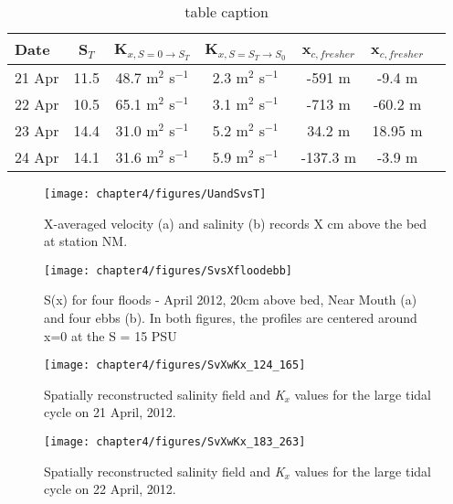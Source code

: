 \begin{table}
\renewcommand{\arraystretch}{1.3}

	\begin{center}
		\begin{tabular}{| l || c | c | c | c | c | c |}
		\hline
		Date & S$_{T}$ & K$_{x,S=0 \rightarrow S_T}$ &  K$_{x,S=S_T \rightarrow S_0}$ & x$_{c,fresher}$ & x$_{c,fresher}$\\
		\hline \hline
		21 Apr & 11.5 & 48.7 m$^2$ s$^{-1}$ & 2.3 m$^2$ s$^{-1}$ & -591 m & -9.4 m\\ 
		22 Apr & 10.5 & 65.1 m$^2$ s$^{-1}$ & 3.1 m$^2$ s$^{-1}$ & -713 m & -60.2 m\\ 
		23 Apr & 14.4 & 31.0 m$^2$ s$^{-1}$ & 5.2 m$^2$ s$^{-1}$ & 34.2 m & 18.95 m\\ 
		24 Apr & 14.1 & 31.6 m$^2$ s$^{-1}$ & 5.9 m$^2$ s$^{-1}$ & -137.3 m & -3.9 m\\  \hline 
	\end{tabular}
	\caption{table caption}\label{tab:Kxtable}
\end{center}
\end{table}






\begin{figure}
	\texttt{[image: chapter4/figures/UandSvsT]} 
\caption{X-averaged velocity (a) and salinity (b) records X cm above the bed at station NM.} \label{fig:UandSvsTch4}
\end{figure}

\begin{figure}
	\texttt{[image: chapter4/figures/SvsXfloodebb]} 
\caption{S(x) for four floods - April 2012, 20cm above bed, Near Mouth (a) and four ebbs (b). In both figures, the profiles are centered around x=0 at the S = 15 PSU} \label{fig:SvsXall}
\end{figure}

\begin{figure}
	\texttt{[image: chapter4/figures/SvXwKx\_124\_165]} 
\caption{Spatially reconstructed salinity field and \emph{K$_x$} values for the large tidal cycle on 21 April, 2012. } \label{fig:Kx421}
\end{figure}

\begin{figure}
	\texttt{[image: chapter4/figures/SvXwKx\_183\_263]} 
\caption{Spatially reconstructed salinity field and \emph{K$_x$} values for the large tidal cycle on 22 April, 2012. } \label{fig:Kx422}
\end{figure}



